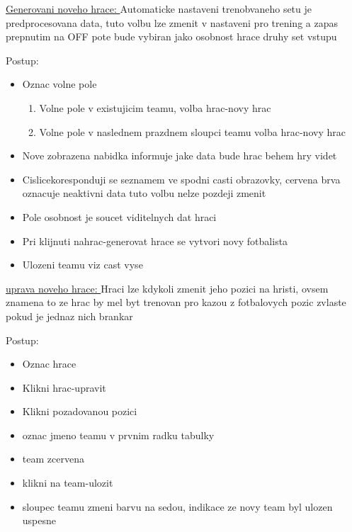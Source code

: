 \documentclass[
  program=ainfk,
  biblatex,
  language=czech,
  figures=true,
  tables ,
  sourcecodes=true,
  glossaries=true,
  index
]{kidiplom}
\begin{document}
\underline{Generovani noveho hrace:  } 
Automaticke nastaveni trenobvaneho setu je predprocesovana data, tuto volbu lze zmenit v nastaveni pro trening a zapas prepnutim na OFF pote bude vybiran jako osobnost hrace druhy set vstupu
 
Postup:
\begin{itemize}
\item  Oznac volne pole
	\begin{enumerate}
	\item Volne pole v existujicim teamu, volba hrac-novy hrac
	\item  Volne pole v naslednem prazdnem sloupci teamu volba hrac-novy hrac
	\end{enumerate}
\item  Nove zobrazena nabidka informuje jake data bude hrac behem hry videt
\item Cislicekoresponduji se seznamem ve spodni casti obrazovky, cervena brva oznacuje neaktivni data tuto volbu nelze pozdeji zmenit
\item   Pole osobnost je soucet viditelnych dat hraci
\item   Pri klijnuti nahrac-generovat hrace se vytvori novy fotbalista
\item   Ulozeni teamu viz cast vyse   
\end{itemize}
 
\underline{uprava noveho hrace: }
Hraci lze kdykoli zmenit jeho pozici na hristi, ovsem znamena to ze hrac by mel byt trenovan pro kazou z fotbalovych pozic zvlaste pokud je jednaz nich brankar 

Postup:
\begin{itemize}
\item  Oznac hrace
\item  Klikni hrac-upravit
\item  Klikni pozadovanou pozici
\item  oznac jmeno teamu v prvnim radku tabulky
\item  team zcervena
\item  klikni na team-ulozit
\item  sloupec teamu zmeni barvu na sedou, indikace ze novy team byl ulozen uspesne
\end{itemize}
\end{document}
